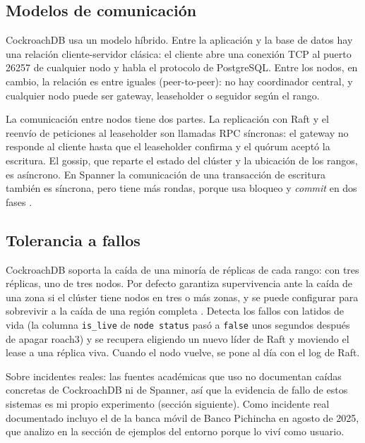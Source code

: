 \documentclass[12pt,a4paper]{article}
\begin{document}
\subsection{Modelos de comunicación}

CockroachDB usa un modelo híbrido. Entre la aplicación y la base de datos hay una relación cliente-servidor clásica: el cliente abre una conexión TCP al puerto 26257 de cualquier nodo y habla el protocolo de PostgreSQL. Entre los nodos, en cambio, la relación es entre iguales (peer-to-peer): no hay coordinador central, y cualquier nodo puede ser gateway, leaseholder o seguidor según el rango.

La comunicación entre nodos tiene dos partes. La replicación con Raft y el reenvío de peticiones al leaseholder son llamadas RPC síncronas: el gateway no responde al cliente hasta que el leaseholder confirma y el quórum aceptó la escritura. El gossip, que reparte el estado del clúster y la ubicación de los rangos, es asíncrono. En Spanner la comunicación de una transacción de escritura también es síncrona, pero tiene más rondas, porque usa bloqueo y \emph{commit} en dos fases \cite{song2025k2}.

\subsection{Tolerancia a fallos}

CockroachDB soporta la caída de una minoría de réplicas de cada rango: con tres réplicas, uno de tres nodos. Por defecto garantiza supervivencia ante la caída de una zona si el clúster tiene nodos en tres o más zonas, y se puede configurar para sobrevivir a la caída de una región completa \cite{ajmani2022demo}. Detecta los fallos con latidos de vida (la columna \texttt{is\_live} de \texttt{node status} pasó a \texttt{false} unos segundos después de apagar roach3) y se recupera eligiendo un nuevo líder de Raft y moviendo el lease a una réplica viva. Cuando el nodo vuelve, se pone al día con el log de Raft.

Sobre incidentes reales: las fuentes académicas que uso no documentan caídas concretas de CockroachDB ni de Spanner, así que la evidencia de fallo de estos sistemas es mi propio experimento (sección siguiente). Como incidente real documentado incluyo el de la banca móvil de Banco Pichincha en agosto de 2025, que analizo en la sección de ejemplos del entorno porque lo viví como usuario.

\end{document}
